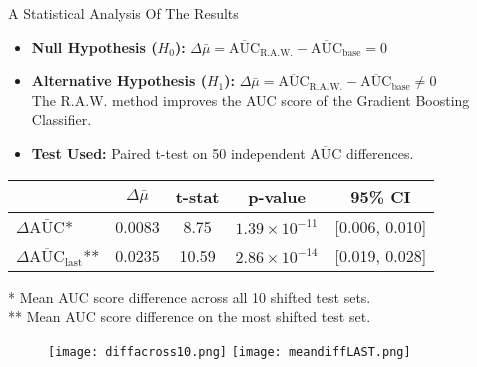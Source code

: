 \begin{frame}{A Statistical Analysis Of The Results}
    \begin{itemize}
        \item \textbf{Null Hypothesis ($H_0$):} $\Delta\bar{\mu} = \overline{\text{AUC}}_{\text{R.A.W.}} - \overline{\text{AUC}}_{\text{base}} = 0$ \\        
        \item \textbf{Alternative Hypothesis ($H_1$):} $\Delta\bar{\mu} = \overline{\text{AUC}}_{\text{R.A.W.}} - \overline{\text{AUC}}_{\text{base}} \neq 0$ \\
        \quad The R.A.W. method improves the AUC score of the Gradient Boosting Classifier.
        
        \item \textbf{Test Used:} Paired t-test on 50 independent $\overline{\text{AUC}}$ differences.
    \end{itemize}
    
    \vspace{1em}
    
    \begin{table}[h!]
        \centering
        \small
        \begin{tabular}{lcccc}
            \toprule
            & $\Delta\bar{\mu}$ & t-stat & p-value & 95\% CI \\
            \midrule
            $\Delta\overline{\text{AUC}}$* & 0.0083 & 8.75  & $1.39 \times 10^{-11}$ & [0.006, 0.010] \\
            $\Delta\overline{\text{AUC}}_{\text{last}}$** & 0.0235 & 10.59 & $2.86 \times 10^{-14}$ & [0.019, 0.028] \\
            \bottomrule
        \end{tabular}
        
    \end{table}
    
    \begin{footnotesize}
        * Mean AUC score difference across all 10 shifted test sets. \\
        ** Mean AUC score difference on the most shifted test set.
    \end{footnotesize}
   
\end{frame}


\begin{frame}
    \begin{figure}
        \centering
        \texttt{[image: diffacross10.png]}
        \hfill
        \texttt{[image: meandiffLAST.png]}
    \end{figure}
\end{frame}

